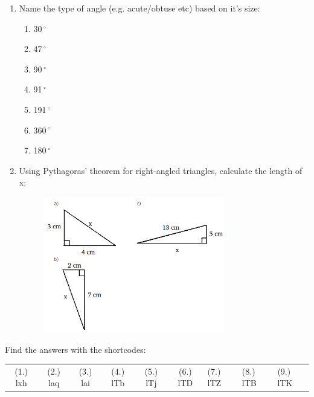 \begin{enumerate}[noitemsep, label=\textbf{\arabic*}. ]
\item Name the type of angle (e.g. acute/obtuse etc) based on it's size:
\begin{enumerate}[noitemsep, label=\textbf{\alph*}. ] 
\item  30\ensuremath{{\,}^{\circ}}\item  47\ensuremath{{\,}^{\circ}}\item  90\ensuremath{{\,}^{\circ}}\item  91\ensuremath{{\,}^{\circ}}\item  191\ensuremath{{\,}^{\circ}}\item  360\ensuremath{{\,}^{\circ}}\item  180\ensuremath{{\,}^{\circ}}\end{enumerate}
\item Using Pythagoras' theorem for right-angled triangles, calculate the length of x:
\setcounter{subfigure}{0}
\begin{figure}[H] %
\begin{center}
\label{m39368*id401236!!!underscore!!!media}\label{m39368*id401236!!!underscore!!!printimage}\includegraphics[width=300px]{col11306.imgs/m39368_MG10C13_070.png} %
\vspace{2pt}
\vspace{.1in}
\end{center}
\end{figure}       
\end{enumerate}

\par {} Find the answers with the shortcodes:
\par \begin{tabular}[h]{cccccc}
(1.) lxh  &  (2.) laq  &  (3.) lai  &  (4.) lTb  &  (5.) lTj  &  (6.) lTD  &  (7.) lTZ  &  (8.) lTB  &  (9.) lTK  & \end{tabular}
